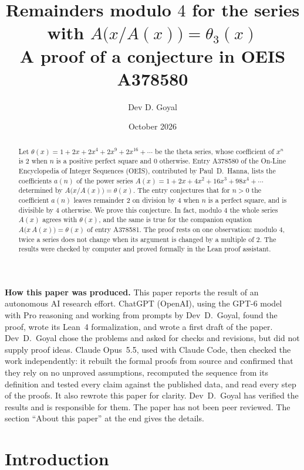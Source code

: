 \documentclass[11pt,a4paper]{article}
\title{Remainders modulo $4$ for the series with $A\bigl(x/A(x)\bigr)=\theta_3(x)$\\[6pt]\large A proof of a conjecture in OEIS A378580}
\author{Dev D. Goyal}
\date{October 2026}
\theoremstyle{definition}
\theoremstyle{remark}
\begin{document}
\maketitle
\begin{abstract}
Let $\theta(x)=1+2x+2x^4+2x^9+2x^{16}+\cdots$ be the theta series, whose coefficient of $x^n$ is $2$ when $n$ is a
positive perfect square and $0$ otherwise. Entry A378580 of the On-Line Encyclopedia of Integer Sequences (OEIS),
contributed by Paul~D.~Hanna, lists the coefficients $a(n)$ of the power series $A(x)=1+2x+4x^2+16x^3+98x^4+\cdots$
determined by $A\bigl(x/A(x)\bigr)=\theta(x)$. The entry conjectures that for $n>0$ the coefficient $a(n)$ leaves remainder $2$ on
division by $4$ when $n$ is a perfect square, and is divisible by $4$ otherwise. We prove this conjecture. In fact,
modulo $4$ the whole series $A(x)$ agrees with $\theta(x)$, and the same is true for the companion equation
$A\bigl(x\,A(x)\bigr)=\theta(x)$ of entry A378581. The proof rests on one observation: modulo $4$, twice a series
does not change when its argument is changed by a multiple of $2$. The results were checked by computer and proved
formally in the Lean proof assistant.
\end{abstract}
\begin{center}\begin{minipage}{0.88\linewidth}\small
\textbf{How this paper was produced.} This paper reports the result of an autonomous AI research effort.
ChatGPT (OpenAI), using the GPT-6 model with Pro reasoning and working from prompts by Dev~D.~Goyal, found the proof, wrote its Lean~4 formalization, and wrote a first draft of the paper.
Dev~D.~Goyal chose the problems and asked for checks and revisions, but did not supply proof ideas.
Claude Opus~5.5, used with Claude Code, then checked the work independently: it rebuilt the formal proofs from
source and confirmed that they rely on no unproved assumptions, recomputed the sequence from its definition and tested
every claim against the published data, and read every step of the proofs. It also rewrote this paper for clarity.
Dev~D.~Goyal has verified the results and is responsible for them. The paper has not been peer reviewed.
The section ``About this paper'' at the end gives the details.
\end{minipage}\end{center}

\section{Introduction}
\end{document}
